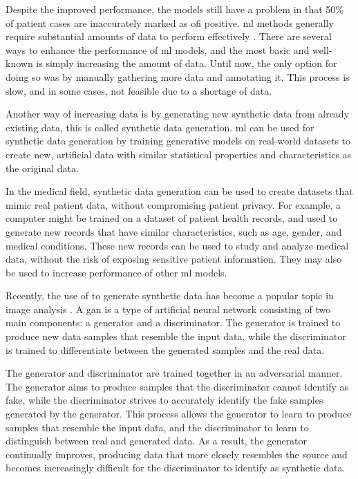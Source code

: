 \documentclass[12pt, a4paper]{article}
\begin{document}
Despite the improved performance, the models still have a problem in that 50\% of patient cases are inaccurately marked as \acrshort{ofi} positive. \acrshort{ml} methods generally require substantial amounts of data to perform effectively \cite{piccialli_survey_2021}. There are several ways to enhance the performance of \acrshort{ml} models, and the most basic and well-known is simply increasing the amount of data. Until now, the only option for doing so was by manually gathering more data and annotating it. This process is slow, and in some cases, not feasible due to a shortage of data.

Another way of increasing data is by generating new synthetic data from already existing data, this is called synthetic data generation. \acrshort{ml} can be used for synthetic data generation by training generative models on real-world datasets to create new, artificial data with similar statistical properties and characteristics as the original data. \cite{}

In the medical field, synthetic data generation can be used to create datasets that mimic real patient data, without compromising patient privacy. For example, a computer might be trained on a dataset of patient health records, and used to generate new records that have similar characteristics, such as age, gender, and medical conditions. These new records can be used to study and analyze medical data, without the risk of exposing sensitive patient information. They may also be used to increase performance of other \acrshort{ml} models. \cite{}

Recently, the use of  to generate synthetic data has become a popular topic in image analysis \cite{pavan_kumar_generative_2021}.  A \acrshort{gan} is a type of artificial neural network consisting of two main components: a generator and a discriminator. The generator is trained to produce new data samples that resemble the input data, while the discriminator is trained to differentiate between the generated samples and the real data.

The generator and discriminator are trained together in an adversarial manner. The generator aims to produce samples that the discriminator cannot identify as fake, while the discriminator strives to accurately identify the fake samples generated by the generator. This process allows the generator to learn to produce samples that resemble the input data, and the discriminator to learn to distinguish between real and generated data. As a result, the generator continually improves, producing data that more closely resembles the source and becomes increasingly difficult for the discriminator to identify as synthetic data. \cite{}
\end{document}
